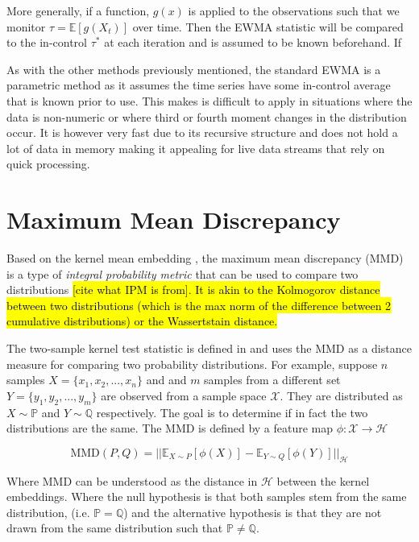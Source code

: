 More generally, if a function, $g(x)$ is applied to the observations such that we monitor $\tau= \mathbb{E}[g(X_t)]$ over time. Then the EWMA statistic will be compared to the in-control $\tau^*$ at each iteration and is assumed to be known beforehand. If 

As with the other methods previously mentioned, the standard EWMA is a parametric method as it assumes the time series have some in-control average that is known prior to use. This makes is difficult to apply in situations where the data is non-numeric or where third or fourth moment changes in the distribution occur. It is however very fast due to its recursive structure and does not hold a lot of data in memory making it appealing for live data streams that rely on quick processing.

\section{Maximum Mean Discrepancy}
\label{mmd}
Based on the kernel mean embedding , the maximum mean discrepancy (MMD) is a type of \textit{integral probability metric} that can be used to compare two distributions \hl{[cite what IPM is from]. It is akin to the Kolmogorov distance between two distributions (which is the max norm of the difference between 2 cumulative distributions) or the Wassertstain distance.}

The two-sample kernel test statistic is defined in \cite{gretton2012kernel} and uses the MMD as a distance measure for comparing two probability distributions. For example, suppose $n$ samples $X = \{x_1, x_2, ..., x_n\}$ and and $m$ samples from a different set $Y=\{y_1, y_2, ..., y_m\}$ are observed from a sample space $\mathcal{X}$. They are distributed as $X \sim  \mathbb{P}$ and $Y \sim \mathbb{Q}$ respectively. The goal is to determine if in fact the two distributions are the same. The MMD is defined by a feature map $\phi: \mathcal{X} \rightarrow \mathcal{H}$

$$\text{MMD}(P,Q)=|| \mathbb{E}_{X \sim P}[\phi(X)] -  \mathbb{E}_{Y \sim Q}[\phi(Y)]||_\mathcal{H}$$

Where MMD can be understood as the distance in $\mathcal{H}$ between the kernel embeddings.
Where the null hypothesis is that both samples stem from the same distribution,  (i.e. $\mathbb{P} = \mathbb{Q}$) and the alternative hypothesis is that they are not drawn from the same distribution such that $\mathbb{P} \neq \mathbb{Q}$.


